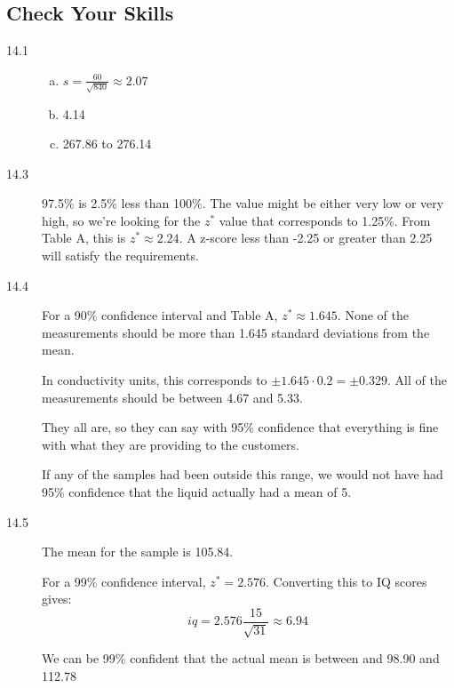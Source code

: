 \documentclass[letterpaper, landscape]{exam}
\begin{document}
  \subsection{Check Your Skills}
  \begin{description}
    \item[14.1] 
      \begin{enumerate}[(a)]

        \item $s = \frac{60}{\sqrt{840}} \approx 2.07$

        \item 4.14

        \item 267.86 to 276.14

      \end{enumerate}

    \item[14.3] 97.5\% is 2.5\% less than 100\%. The value might be either very low
      or very high, so we're looking for the $z^*$ value that corresponds to
      1.25\%. From Table A, this is $z^* \approx 2.24$. A z-score less than
      -2.25 or greater than 2.25 will satisfy the requirements.

    \item[14.4]
      For a 90\% confidence interval and Table A, $z^* \approx 1.645$. None of
      the measurements should be more than 1.645 standard deviations from the
      mean.

      In conductivity units, this corresponds to $\pm 1.645 \cdot 0.2 = \pm
      0.329$. All of the measurements should be between 4.67 and 5.33.

      They all are, so they can say with 95\% confidence that everything is
      fine with what they are providing to the customers.

      If any of the samples had been outside this range, we would not have had
      95\% confidence that the liquid actually had a mean of 5.

    \item[14.5]
      The mean for the sample is 105.84. 

      For a 99\% confidence interval, $z^* = 2.576$. Converting this to IQ
      scores gives:
      \[
        iq = 2.576 \frac{15}{\sqrt{31}} \approx 6.94
      \]

      We can be 99\% confident that the actual mean is between and 98.90 and 112.78

    \end{description}
\end{document}
